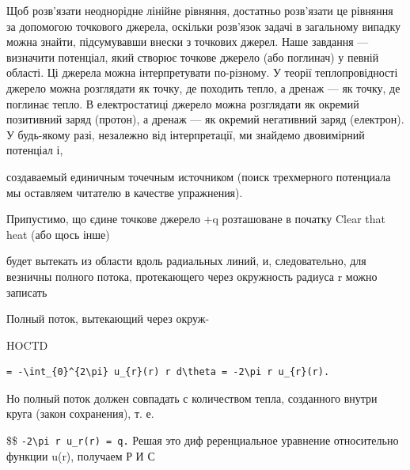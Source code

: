 \documentclass[
  ukrainian,
]{article}
\begin{document}
Щоб розв'язати неоднорідне лінійне рівняння, достатньо розв'язати це
рівняння за допомогою точкового джерела, оскільки розв'язок задачі в
загальному випадку можна знайти, підсумувавши внески з точкових джерел.
Наше завдання --- визначити потенціал, який створює точкове джерело (або
поглинач) у певній області. Ці джерела можна інтерпретувати по-різному.
У теорії теплопровідності джерело можна розглядати як точку, де походить
тепло, а дренаж --- як точку, де поглинає тепло. В електростатиці
джерело можна розглядати як окремий позитивний заряд (протон), а дренаж
--- як окремий негативний заряд (електрон). У будь-якому разі, незалежно
від інтерпретації, ми знайдемо двовимірний потенціал і,

создаваемый единичным точечным источником (поиск трехмерного потенциала
мы оставляем читателю в качестве упражнения).

Припустимо, що єдине точкове джерело +q розташоване в початку Clear that
heat (або щось інше)

будет вытекать из области вдоль радиальных линий, и, следовательно, для
везничны полного потока, протекающего через окружность радиуса r можно
записать

Полный поток, вытекающий через окруж-

HOCTD

\begin{verbatim}
= -\int_{0}^{2\pi} u_{r}(r) r d\theta = -2\pi r u_{r}(r).
\end{verbatim}

Но полный поток должен совпадать с количеством тепла, созданного внутри
круга (закон сохранения), т. е.

\$\$ \texttt{-2\textbackslash{}pi\ r\ u\_r(r)\ =\ q.} Решая это диф
реренциальное уравнение относительно функции u(r), получаем Р И С
\end{document}
